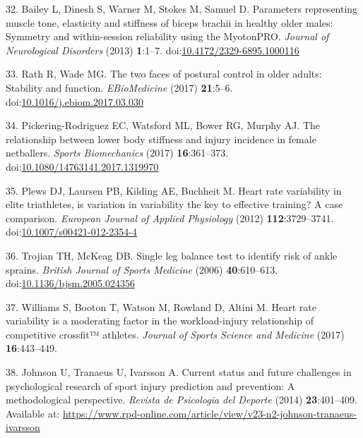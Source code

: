 \documentclass[
  english,
  man]{apa6}
\newenvironment{cslreferences}%
  {}%
  {\par}
\begin{document}
\begin{cslreferences}
\leavevmode\hypertarget{ref-Bailey2013}{}%
32. Bailey L, Dinesh S, Warner M, Stokes M, Samuel D. Parameters representing muscle tone, elasticity and stiffness of biceps brachii in healthy older males: Symmetry and within-session reliability using the MyotonPRO. \emph{Journal of Neurological Disorders} (2013) \textbf{1}:1--7. doi:\href{https://doi.org/10.4172/2329-6895.1000116}{10.4172/2329-6895.1000116}

\leavevmode\hypertarget{ref-Rath2017}{}%
33. Rath R, Wade MG. The two faces of postural control in older adults: Stability and function. \emph{EBioMedicine} (2017) \textbf{21}:5--6. doi:\href{https://doi.org/10.1016/j.ebiom.2017.03.030}{10.1016/j.ebiom.2017.03.030}

\leavevmode\hypertarget{ref-PickeringRodriguez2017}{}%
34. Pickering-Rodriguez EC, Watsford ML, Bower RG, Murphy AJ. The relationship between lower body stiffness and injury incidence in female netballers. \emph{Sports Biomechanics} (2017) \textbf{16}:361--373. doi:\href{https://doi.org/10.1080/14763141.2017.1319970}{10.1080/14763141.2017.1319970}

\leavevmode\hypertarget{ref-Plews2012}{}%
35. Plews DJ, Laursen PB, Kilding AE, Buchheit M. Heart rate variability in elite triathletes, is variation in variability the key to effective training? A case comparison. \emph{European Journal of Applied Physiology} (2012) \textbf{112}:3729--3741. doi:\href{https://doi.org/10.1007/s00421-012-2354-4}{10.1007/s00421-012-2354-4}

\leavevmode\hypertarget{ref-Trojian2006}{}%
36. Trojian TH, McKeag DB. Single leg balance test to identify risk of ankle sprains. \emph{British Journal of Sports Medicine} (2006) \textbf{40}:610--613. doi:\href{https://doi.org/10.1136/bjsm.2005.024356}{10.1136/bjsm.2005.024356}

\leavevmode\hypertarget{ref-Williams2017}{}%
37. Williams S, Booton T, Watson M, Rowland D, Altini M. Heart rate variability is a moderating factor in the workload-injury relationship of competitive crossfit™ athletes. \emph{Journal of Sports Science and Medicine} (2017) \textbf{16}:443--449.

\leavevmode\hypertarget{ref-Johnson2014}{}%
38. Johnson U, Tranaeus U, Ivarsson A. Current status and future challenges in psychological research of sport injury prediction and prevention: A methodological perspective. \emph{Revista de Psicologia del Deporte} (2014) \textbf{23}:401--409. Available at: \url{https://www.rpd-online.com/article/view/v23-n2-johnson-tranaeus-ivarsson}


\end{cslreferences}
\end{document}
